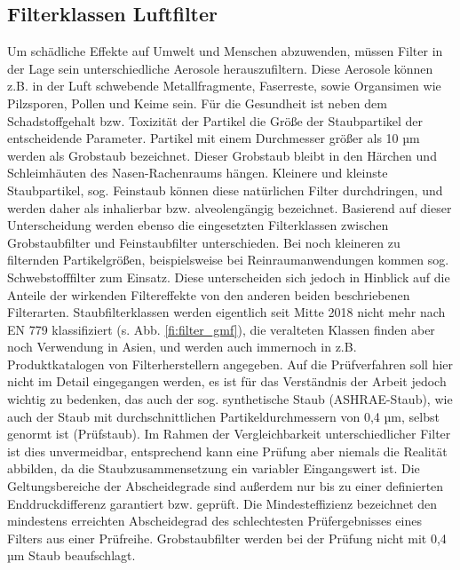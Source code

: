 \subsection{Filterklassen Luftfilter}
\label{sec:filterklassen}
Um schädliche Effekte auf Umwelt und Menschen abzuwenden, müssen Filter in der Lage sein unterschiedliche Aerosole herauszufiltern. Diese Aerosole können z.B. in der Luft schwebende Metallfragmente, Faserreste, sowie Organsimen wie Pilzsporen, Pollen und Keime sein. Für die Gesundheit ist neben dem Schadstoffgehalt bzw. Toxizität der Partikel die Größe der Staubpartikel der entscheidende Parameter. \cite{Grundlagen_Filtertechnik} Partikel mit einem Durchmesser größer als 10 µm werden als Grobstaub bezeichnet. Dieser Grobstaub bleibt in den Härchen und Schleimhäuten des Nasen-Rachenraums hängen. Kleinere und kleinste Staubpartikel, sog. Feinstaub können diese natürlichen Filter durchdringen, und werden daher als inhalierbar bzw. alveolengängig bezeichnet. \newline
Basierend auf dieser Unterscheidung werden ebenso die eingesetzten Filterklassen zwischen Grobstaubfilter und Feinstaubfilter unterschieden. Bei noch kleineren zu filternden Partikelgrößen, beispielsweise bei Reinraumanwendungen kommen sog. Schwebstofffilter zum Einsatz. Diese unterscheiden sich jedoch in Hinblick auf die Anteile der wirkenden Filtereffekte von den anderen beiden beschriebenen Filterarten. \newline
Staubfilterklassen werden eigentlich seit Mitte 2018 nicht mehr nach EN 779 klassifiziert (s. Abb. \ref{fi:filter_gmf}), die veralteten Klassen finden aber noch Verwendung in Asien, und werden auch immernoch in z.B. Produktkatalogen von Filterherstellern angegeben. Auf die Prüfverfahren soll hier nicht im Detail eingegangen werden, es ist für das Verständnis der Arbeit jedoch wichtig zu bedenken, das auch der sog. synthetische Staub (ASHRAE-Staub), wie auch der Staub mit durchschnittlichen Partikeldurchmessern von 0,4 µm, selbst genormt ist (Prüfstaub). Im Rahmen der Vergleichbarkeit unterschiedlicher Filter ist dies unvermeidbar, entsprechend kann eine Prüfung aber niemals die Realität abbilden, da die Staubzusammensetzung ein variabler Eingangswert ist. Die Geltungsbereiche der Abscheidegrade sind außerdem nur bis zu einer definierten Enddruckdifferenz garantiert bzw. geprüft. Die Mindesteffizienz bezeichnet den mindestens erreichten Abscheidegrad des schlechtesten Prüfergebnisses eines Filters aus einer Prüfreihe. Grobstaubfilter werden bei der Prüfung nicht mit 0,4 µm Staub beaufschlagt.\cite{Grundlagen_Filtertechnik}
